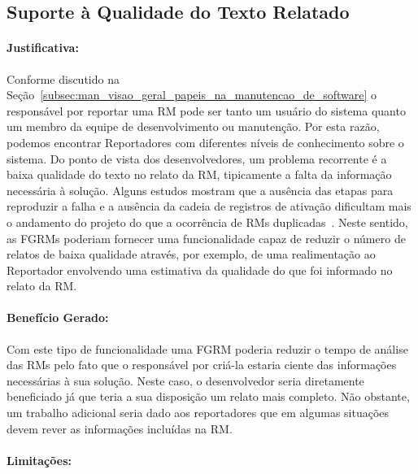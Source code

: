 \subsection{Suporte à Qualidade do Texto Relatado}
\label{sub:supote_a_qualidade_do_relato}


\paragraph{Justificativa:}
\label{par:justificativa_s01}

Conforme discutido na
Seção~\ref{subsec:man_visao_geral_papeis_na_manutencao_de_software} o
responsável por reportar uma RM pode ser tanto um usuário do sistema quanto um
membro da equipe de desenvolvimento ou manutenção. Por esta razão, podemos
encontrar Reportadores com diferentes níveis de conhecimento sobre o sistema.
Do ponto de vista dos desenvolvedores, um problema recorrente é a baixa
qualidade do texto no relato da RM, tipicamente a falta da informação necessária
à solução. Alguns estudos mostram que a ausência das etapas para reproduzir a
falha e a ausência da cadeia de registros de ativação dificultam mais o
andamento do projeto do que a ocorrência de RMs
duplicadas~\cite{bettenburg2008makes, bettenburg2007quality}. Neste sentido, as
FGRMs poderiam fornecer uma funcionalidade capaz de reduzir o número de relatos
de baixa qualidade através, por exemplo, de uma realimentação ao Reportador
envolvendo uma estimativa da qualidade do que foi informado no relato da RM\@.

\paragraph{Benefício Gerado:}
\label{par:beneficio_s01}

Com este tipo de funcionalidade uma FGRM poderia reduzir o tempo de análise das
RMs pelo fato que o responsável por criá-la estaria ciente das informações
necessárias à sua solução. Neste caso, o desenvolvedor seria diretamente
beneficiado já que teria a sua disposição um relato mais completo. Não obstante,
um trabalho adicional seria dado aos reportadores que em algumas situações devem
rever as informações incluídas na RM\@.

\paragraph{Limitações:}
\label{par:limitacoes_s01}

